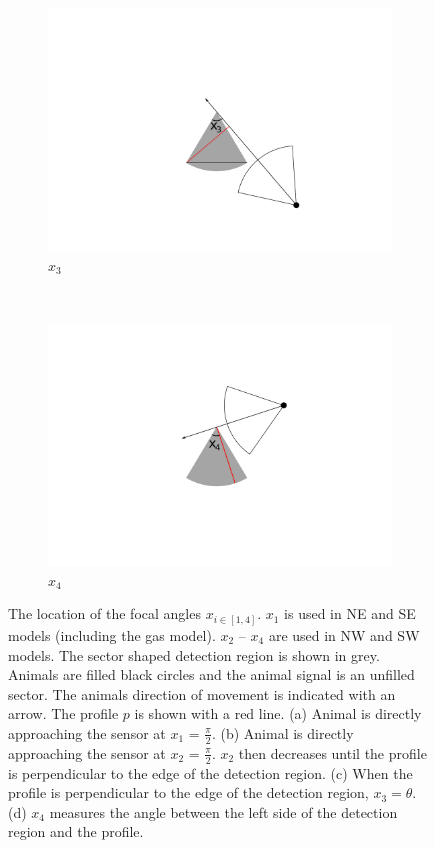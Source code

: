 \begin{figure}[t]
\begin{subfigure}[t]{0.22\textwidth}
                \centering
        \includegraphics[width=1\textwidth, trim=9cm 2cm 9cm 2cm]{imgs/x3.pdf}
                \caption{$x_3$}               
                \label{f:x3}
        \end{subfigure}%
	~
	\begin{subfigure}[t]{0.22\textwidth}
                \centering
        \includegraphics[width=1\textwidth, trim=9cm 2cm 9cm 2cm]{imgs/x4.pdf}
                \caption{$x_4$}               
                \label{f:x4}
        \end{subfigure}%
\caption{The location of the focal angles $x_{i\in[1,4]}$. $x_1$ is used in NE and SE models (including the gas model). $x_2$ -- $x_4$ are used in NW and SW models. The sector shaped detection region is shown in grey. Animals are filled black circles and the animal signal is an unfilled sector. The animals direction of movement is indicated with an arrow. The profile $p$ is shown with a red line. (a) Animal is directly approaching the sensor at $x_1$ = $\frac{\pi}{2}$. (b) Animal is directly approaching the sensor at $x_2$ = $\frac{\pi}{2}$. $x_2$ then decreases until the profile is perpendicular to the edge of the detection region. (c) When the profile is perpendicular to the edge of the detection region, $x_3 = \theta$. (d) $x_4$ measures the angle between the left side of the detection region and the profile.}

\label{f:xis}
\end{figure}
